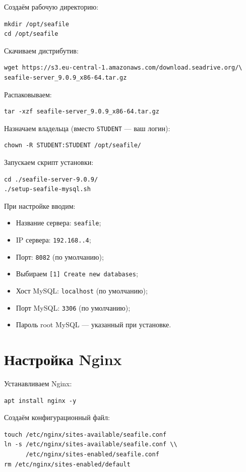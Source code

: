 Создаём рабочую директорию:
\begin{lstlisting}
mkdir /opt/seafile
cd /opt/seafile
\end{lstlisting}

Скачиваем дистрибутив:
\begin{lstlisting}
wget https://s3.eu-central-1.amazonaws.com/download.seadrive.org/\
seafile-server_9.0.9_x86-64.tar.gz
\end{lstlisting}

Распаковываем:
\begin{lstlisting}
tar -xzf seafile-server_9.0.9_x86-64.tar.gz
\end{lstlisting}

Назначаем владельца (вместо \texttt{STUDENT} — ваш логин):
\begin{lstlisting}
chown -R STUDENT:STUDENT /opt/seafile/
\end{lstlisting}

Запускаем скрипт установки:
\begin{lstlisting}
cd ./seafile-server-9.0.9/
./setup-seafile-mysql.sh
\end{lstlisting}

При настройке вводим:
\begin{itemize}
  \item Название сервера: \texttt{seafile};
  \item IP сервера: \texttt{192.168.\cfgLabStudentN.4};
  \item Порт: \texttt{8082} (по умолчанию);
  \item Выбираем \texttt{[1] Create new databases};
  \item Хост MySQL: \texttt{localhost} (по умолчанию);
  \item Порт MySQL: \texttt{3306} (по умолчанию);
  \item Пароль root MySQL — указанный при установке.
\end{itemize}

\section{Настройка Nginx}

Устанавливаем Nginx:
\begin{lstlisting}
apt install nginx -y
\end{lstlisting}

Создаём конфигурационный файл:
\begin{lstlisting}
touch /etc/nginx/sites-available/seafile.conf
ln -s /etc/nginx/sites-available/seafile.conf \\
      /etc/nginx/sites-enabled/seafile.conf
rm /etc/nginx/sites-enabled/default
\end{lstlisting}

